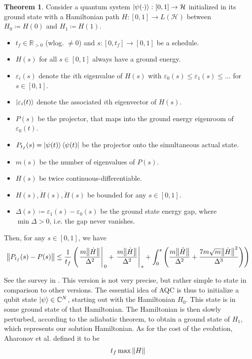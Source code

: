 \documentclass[10pt]{amsart}
\theoremstyle{definition}
\newtheorem{theorem}{Theorem}
\theoremstyle{remark}
\newcommand{\evalat}[2]{\left.{#1}\middle|\right._{#2}}
\begin{document}
    \begin{theorem}
        Consider a quantum system \(\ket{\psi(\cdot)}\colon [0, 1] \to \mathcal{H}\) initialized in its ground state with a Hamiltonian path \(H\colon [0, 1] \to L(\mathcal{H})\) between \(H_0 \coloneqq H(0)\) and \(H_1 \coloneqq H(1)\).
        \begin{itemize}
            \item \(t_f \in \mathbb{R}_{> 0}\) (wlog. \(\neq 0\)) and \(s\colon [0, t_f] \to [0, 1]\) be a schedule.
            \item \(H(s)\) for all \(s \in [0, 1]\) always have a ground energy.
            \item \(\varepsilon_i(s)\) denote the \(i\)th eigenvalue of \(H(s)\) with \(\varepsilon_0(s) \leq \varepsilon_1(s) \leq ...\) for \(s \in [0, 1]\).
            \item \(\ket{\varepsilon_i(t)}\) denote the associated \(i\)th eigenvector of \(H(s)\).
            \item \(P(s)\) be the projector, that maps into the ground energy eigenroom of \(\varepsilon_0(t)\).
            \item \(P_{t_f}(s) = \ket{\psi(t)}\bra{\psi(t)}\) be the projector onto the simultaneous actual state.
            \item \(m(s)\) be the number of eigenvalues of \(P(s)\).
            \item \(H(s)\) be twice continuous-differentiable.
            \item \(H(s), \dot{H}(s), \ddot{H}(s)\) be bounded for any \(s \in [0, 1]\).
            \item \(\Delta(s) \coloneqq \varepsilon_1(s) - \varepsilon_0(s)\) be the ground state energy gap, where \(\min \Delta > 0\), i.e. the gap never vanishes.
        \end{itemize}
        Then, for any \(s \in [0, 1]\), we have
        \begin{align}
            \norm{P_{t_f}(s)-P(s)} \leq \frac{1}{t_f} \left(\evalat{\frac{m\norm{\dot{H}}}{\Delta^2}}{0} + \evalat{\frac{m\norm{\dot{H}}}{\Delta^2}}{s} + \int_0^s \left(\frac{m\norm{\ddot{H}}}{\Delta^2} + \frac{7m\sqrt{m}\norm{\dot{H}}^2}{\Delta^3}\right)\right)
        \end{align}
    \end{theorem}

    See the survey in \cite[p. 7]{Albash2016}. This version is not very precise, but rather simple to state in comparison to other versions. 
    The essential idea of AQC is thus to initialize a qubit state \(\ket{\psi} \in \mathbb{C}^N\), starting out with the Hamiltonian \(H_0\). This state is in some ground state of that Hamiltonian. The Hamiltonian is then slowly perturbed, according to the adiabatic theorem, to obtain a ground state of \(H_1\), which represents our solution Hamiltonian. As for the cost of the evolution, Aharonov et al. \cite[p. 3]{Albash2016} defined it to be
    \begin{align}
        t_f \max\norm{H}
    \end{align}
\end{document}
